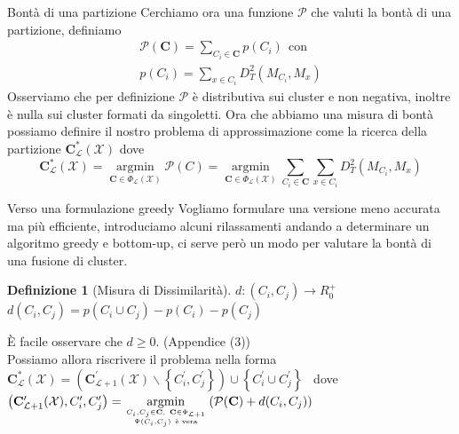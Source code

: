 \documentclass[usenames,dvipsnames,9pt]{beamer}
\theoremstyle{definition}
\newtheorem{deff}{Definizione}
\begin{document}
\begin{frame}{Bontà di una partizione}
Cerchiamo ora una funzione $\mathcal{P}$ che valuti la bontà di una partizione, definiamo
\begin{equation*}
\begin{gathered}
	\mathcal{P}(\textbf{C}) = \sum_{C_i\in\textbf{C}}p(C_i) \ \ \text{con} \\
	p(C_i) = \sum_{x\in C_i}D^{2}_T(M_{C_i}, M_x)
\end{gathered}
\end{equation*}
Osserviamo che per definizione $\mathcal{P}$ è distributiva sui cluster e non negativa, inoltre è nulla sui cluster formati da singoletti.
Ora che abbiamo una misura di bontà possiamo definire il nostro problema di approssimazione come la ricerca della partizione $\mathbf{C}_{\mathcal{L}}^{*}(\mathcal{X})$ dove
\begin{equation*}
\mathbf{C}_{\mathcal{L}}^{*}(\mathcal{X})=\underset{\mathbf{C} \in \Phi_{\mathcal{L}}(\mathcal{X})}{\operatorname{argmin}} \mathcal{P}(C)= \underset{\mathbf{C} \in \Phi_{\mathcal{L}}(\mathcal{X})}{\operatorname{argmin}} \sum_{C_{i} \in \mathbf{C}} \sum_{x \in C_{i}} D_{T}^{2}\left(M_{C_{i}}, M_{x}\right)
\end{equation*}
\end{frame}

\begin{frame}{Verso una formulazione greedy}
Vogliamo formulare una versione meno accurata ma più efficiente,
introduciamo alcuni rilassamenti andando a determinare un algoritmo greedy e bottom-up, ci serve però un modo per valutare la bontà di una fusione di cluster.
\begin{deff}[Misura di Dissimilarità]
$d:(C_i, C_j)\to R^{+}_0$ \\
$d(C_i, C_j) = p(C_i\cup C_j) - p(C_i) - p(C_j)$
\end{deff}
È facile osservare che $d\geq 0$. (Appendice (3)) \\

Possiamo allora riscrivere il problema nella forma
$\mathbf{C}_{\mathcal{L}}^{*}(\mathcal{X})=\left(\mathbf{C}_{\mathcal{L}+1}^{\prime}(\mathcal{X}) \backslash\left\{C_{i}^{\prime}, C_{j}^{\prime}\right\}\right) \cup\left\{C_{i}^{\prime} \cup C_{j}^{\prime}\right\}$ \ dove \\
$\left(\mathbf{C}_{\mathcal{L}+1}^\prime(\mathcal{X}), C_{i}^{\prime}, C_{j}^{\prime}\right)=\underset{C_{i}, C_{j} \in \mathbf{C}, \ \mathbf{C} \in \Phi_{\mathcal{L}+1} \atop \Psi(C_i, C_j) \ \text{è vera}}{\operatorname{argmin}}\left(\mathcal{P}(\mathbf{C})+d(C_{i}, C_{j})\right)$
\end{frame}
\end{document}
